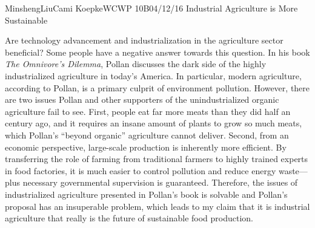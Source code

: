 \documentclass[12pt,letterpaper]{article}
\begin{document}
\begin{mla}{Minsheng}{Liu}{Cami Koepke}{WCWP 10B}{04/12/16}
  {Industrial Agriculture is More Sustainable}

Are technology advancement and industrialization in the agriculture
sector beneficial? Some people have a negative answer towards this
question. In his book \emph{The Omnivore's Dilemma}, Pollan discusses
the dark side of the highly industrialized agriculture in today's
America. In particular, modern agriculture, according to Pollan, is a
primary culprit of environment pollution. However, there are two issues
Pollan and other supporters of the unindustrialized organic agriculture
fail to see. First, people eat far more meats than they did half an
century ago, and it requires an insane amount of plants to grow so much
meats, which Pollan's ``beyond organic'' agriculture cannot deliver.
Second, from an economic perspective, large-scale production is
inherently more efficient. By transferring the role of farming from
traditional farmers to highly trained experts in food factories, it is
much easier to control pollution and reduce energy waste---plus
necessary governmental supervision is guaranteed. Therefore, the issues
of industrialized agriculture presented in Pollan's book is solvable and
Pollan's proposal has an insuperable problem, which leads to my claim
that it is industrial agriculture that really is the future of
sustainable food production.


\end{mla}
\end{document}
